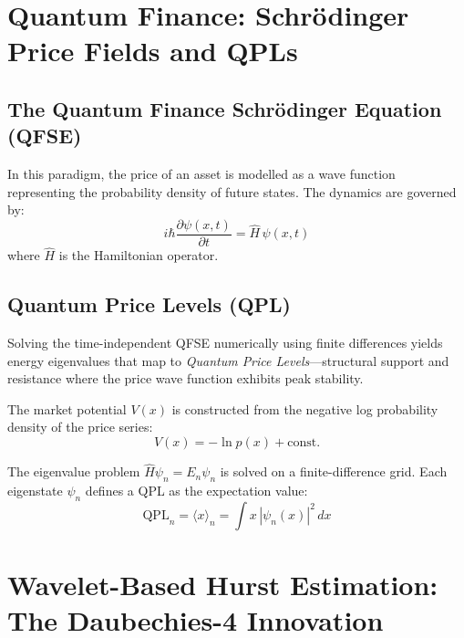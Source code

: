 \documentclass[12pt,a4paper]{article}
\begin{document}
\section{Quantum Finance: Schr\"{o}dinger Price Fields and QPLs}
\label{sec:quantum}

\subsection{The Quantum Finance Schr\"{o}dinger Equation (QFSE)}

In this paradigm, the price of an asset is modelled as a wave function
representing the probability density of future states.  The dynamics are
governed by:
\begin{equation}
  i\hbar \frac{\partial \psi(x,t)}{\partial t} = \hat{H}\,\psi(x,t)
  \label{eq:qfse}
\end{equation}
where $\hat{H}$ is the Hamiltonian operator.

\subsection{Quantum Price Levels (QPL)}

Solving the time-independent QFSE numerically using finite differences
yields energy eigenvalues that map to \emph{Quantum Price Levels}---structural
support and resistance where the price wave function exhibits peak stability.

The market potential $V(x)$ is constructed from the negative log probability
density of the price series:
\begin{equation}
  V(x) = -\ln p(x) + \text{const.}
  \label{eq:potential}
\end{equation}

The eigenvalue problem $\hat{H}\psi_n = E_n\psi_n$ is solved on a
finite-difference grid.  Each eigenstate $\psi_n$ defines a QPL as the
expectation value:
\begin{equation}
  \mathrm{QPL}_n = \langle x \rangle_n = \int x\,|\psi_n(x)|^2\,dx
  \label{eq:qpl}
\end{equation}

\section{Wavelet-Based Hurst Estimation: The Daubechies-4 Innovation}
\label{sec:wavelet}
\end{document}
